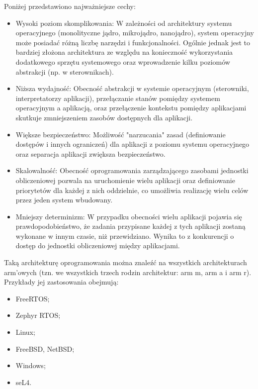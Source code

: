 \documentclass[../../main]{subfiles}
\begin{document}
Poniżej przedstawiono najważniejsze cechy:
\begin{itemize}
    \item Wysoki poziom skomplikowania: W zależności od architektury systemu operacyjnego (monolityczne jądro, mikrojądro, nanojądro), system operacyjny może posiadać różną liczbę narzędzi i funkcjonalności. Ogólnie jednak jest to bardziej złożona architektura ze względu na konieczność wykorzystania dodatkowego sprzętu systemowego oraz wprowadzenie kilku poziomów abstrakcji (np. w sterownikach).
    \item Niższa wydajność: Obecność abstrakcji w systemie operacyjnym (sterowniki,     interpretatorzy aplikacji), przełączanie stanów pomiędzy systemem operacyjnym a aplikacją, oraz przełączenie kontekstu pomiędzy aplikacjami skutkuje zmniejszeniem zasobów dostępnych dla aplikacji.
    \item Większe bezpieczeństwo: Możliwość "narzucania" zasad (definiowanie dostępów i innych ograniczeń) dla aplikacji z poziomu systemu operacyjnego oraz separacja aplikacji zwiększa bezpieczeństwo.
    \item Skalowalność: Obecność oprogramowania zarządzającego zasobami jednostki obliczeniowej pozwala na uruchomienie wielu aplikacji oraz definiowanie priorytetów dla każdej z nich oddzielnie, co umożliwia realizację wielu celów przez jeden system wbudowany.
    \item Mniejszy determinizm: W przypadku obecności wielu aplikacji pojawia się prawdopodobieństwo, że zadania przypisane każdej z tych aplikacji zostaną wykonane w innym czasie, niż przewidziano. Wynika to z konkurencji o dostęp do jednostki obliczeniowej między aplikacjami.
\end{itemize}

Taką architekturę oprogramowania można znaleźć na wszystkich architekturach \acrshort{arm}'owych (tzn. we wszystkich trzech rodzin architektur: \acrshort{arm} \acrshort{m}, \acrshort{arm} \acrshort{a} i \acrshort{arm} \acrshort{r}). Przykłady jej zastosowania obejmują:

\begin{itemize}
    \item FreeRTOS;
    \item Zephyr RTOS;
    \item Linux;
    \item FreeBSD, NetBSD;
    \item Windows;
    \item seL4.
\end{itemize}
\end{document}
